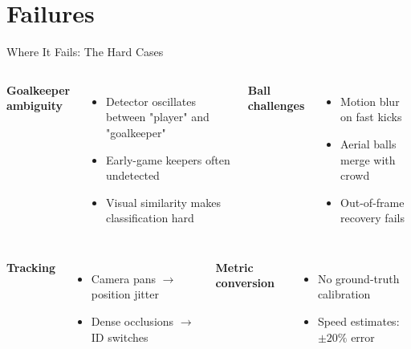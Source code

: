\documentclass[aspectratio=169]{beamer}
\begin{document}
\section{Failures}
\begin{frame}{Where It Fails: The Hard Cases}
  \begin{columns}[T]
    \textbf{Goalkeeper ambiguity}
    \begin{itemize}
      \small
      \item Detector oscillates between "player" and "goalkeeper"
      \item Early-game keepers often undetected
      \item Visual similarity makes classification hard
    \end{itemize}
    
    \textbf{Ball challenges}
    \begin{itemize}
      \small
      \item Motion blur on fast kicks
      \item Aerial balls merge with crowd
      \item Out-of-frame recovery fails
    \end{itemize}
  \end{columns}
  
  \vspace{0.3cm}
  \begin{columns}[T]
    \textbf{Tracking}
    \begin{itemize}
      \small
      \item Camera pans $\to$ position jitter
      \item Dense occlusions $\to$ ID switches
    \end{itemize}
    
    \textbf{Metric conversion}
    \begin{itemize}
      \small
      \item No ground-truth calibration
      \item Speed estimates: $\pm 20\%$ error
    \end{itemize}
  \end{columns}
\end{frame}
\end{document}
